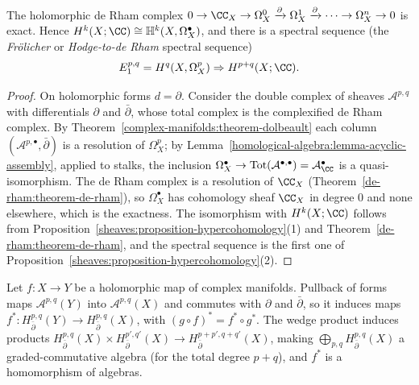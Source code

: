 \begin{theorem}\label{complex-manifolds:theorem-holomorphic-de-rham}
The holomorphic de Rham complex $0 \to \CC_X \to \Omega^0_X \xrightarrow{\partial} \Omega^1_X \xrightarrow{\partial} \cdots \to \Omega^n_X \to 0$ is exact. Hence
$H^k(X; \CC) \cong \mathbb{H}^k(X, \Omega^\bullet_X)$, and there is a spectral sequence (the \emph{Fr\"olicher} or \emph{Hodge-to-de Rham} spectral sequence)
\[
E_1^{p,q} = H^q(X, \Omega^p_X) \Rightarrow H^{p+q}(X; \CC).
\]
\end{theorem}

\begin{proof}
On holomorphic forms $d = \partial$. Consider the double complex of sheaves $\mathcal{A}^{p,q}$ with differentials $\partial$ and $\bar\partial$, whose total complex is the complexified de Rham complex. By
Theorem~\ref{complex-manifolds:theorem-dolbeault} each column $(\mathcal{A}^{p,\bullet}, \bar\partial)$ is a resolution of $\Omega^p_X$; by Lemma~\ref{homological-algebra:lemma-acyclic-assembly}, applied to stalks, the
inclusion $\Omega^\bullet_X \to \mathrm{Tot}(\mathcal{A}^{\bullet,\bullet}) = \mathcal{A}^\bullet_\CC$ is a quasi-isomorphism. The de Rham complex is a resolution of $\CC_X$
(Theorem~\ref{de-rham:theorem-de-rham}), so $\Omega^\bullet_X$ has cohomology sheaf $\CC_X$ in degree $0$ and none elsewhere, which is the exactness. The isomorphism with $H^k(X; \CC)$ follows from
Proposition~\ref{sheaves:proposition-hypercohomology}(1) and Theorem~\ref{de-rham:theorem-de-rham}, and the spectral sequence is the first one of
Proposition~\ref{sheaves:proposition-hypercohomology}(2).
\end{proof}

\begin{proposition}\label{complex-manifolds:proposition-functoriality}
Let $f \colon X \to Y$ be a holomorphic map of complex manifolds. Pullback of forms maps $\mathcal{A}^{p,q}(Y)$ into $\mathcal{A}^{p,q}(X)$ and commutes with $\partial$ and $\bar\partial$, so it induces
maps $f^* \colon H^{p,q}_{\bar\partial}(Y) \to H^{p,q}_{\bar\partial}(X)$, with $(g \circ f)^* = f^* \circ g^*$. The wedge product induces products
$H^{p,q}_{\bar\partial}(X) \times H^{p',q'}_{\bar\partial}(X) \to H^{p+p',q+q'}_{\bar\partial}(X)$, making $\bigoplus_{p,q}H^{p,q}_{\bar\partial}(X)$ a graded-commutative algebra (for the total degree $p + q$), and
$f^*$ is a homomorphism of algebras.
\end{proposition}

